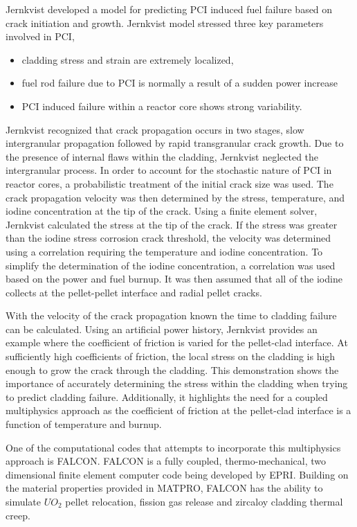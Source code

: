 \documentclass[edeposit,fullpage,12pt]{uiucthesis2009}
\begin{document}
Jernkvist \cite{jernkvist_model_1995} developed a model for predicting \gls{PCI} induced fuel failure based on crack initiation and growth.
Jernkvist model stressed three key parameters involved in \gls{PCI},
\begin{itemize} 
\item cladding stress and strain are extremely localized, 
\item fuel rod failure due to \gls{PCI} is normally a result of a sudden power increase 
\item \gls{PCI} induced failure within a reactor core shows strong variability.
\end{itemize}
Jernkvist recognized that crack propagation occurs in two stages, slow intergranular propagation followed by rapid transgranular crack growth.
Due to the presence of internal flaws within the cladding, Jernkvist neglected the intergranular process.
In order to account for the stochastic nature of \gls{PCI} in reactor cores, a probabilistic treatment of the initial crack size was used.
The crack propagation velocity was then determined by the stress, temperature, and iodine concentration at the tip of the crack.
Using a finite element solver, Jernkvist calculated the stress at the tip of the crack.
If the stress was greater than the iodine stress corrosion crack threshold, the velocity was determined using a correlation requiring the temperature and iodine concentration.
To simplify the determination of the iodine concentration, a correlation was used based on the power and fuel burnup.
It was then assumed that all of the iodine collects at the pellet-pellet interface and radial pellet cracks.

With the velocity of the crack propagation known the time to cladding failure can be calculated.
Using an artificial power history, Jernkvist provides an example where the coefficient of friction is varied for the pellet-clad interface.
At sufficiently high coefficients of friction, the local stress on the cladding is high enough to grow the crack through the cladding.
This demonstration shows the importance of accurately determining the stress within the cladding when trying to predict cladding failure.
Additionally, it highlights the need for a coupled multiphysics approach as the coefficient of friction at the pellet-clad interface is a function of temperature and burnup.

One of the computational codes that attempts to incorporate this multiphysics approach is FALCON. %
FALCON is a fully coupled, thermo-mechanical, two dimensional finite element computer code being developed by \gls{EPRI}.
Building on the material properties provided in MATPRO, FALCON has the ability to simulate $UO_2$ pellet relocation, fission gas release and zircaloy cladding thermal creep.
\end{document}

